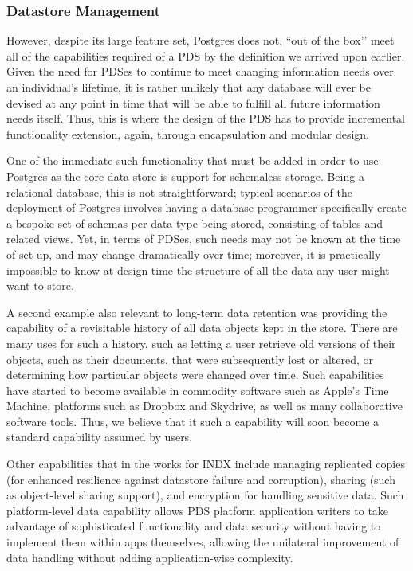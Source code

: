 \documentclass[graybox]{svmult}
\begin{document}
\subsubsection{Datastore Management}
However, despite its large feature set, Postgres does not, ``out of the box’’ meet all of the capabilities required of a PDS by the definition we arrived upon earlier.  Given the need for PDSes to continue to meet changing information needs over an individual’s lifetime, it is rather unlikely that any database will ever be devised at any point in time that will be able to fulfill all future information needs itself.  Thus, this is where the design of the PDS has to provide incremental functionality extension, again, through encapsulation and modular design.

One of the immediate such functionality that must be added in order to use Postgres as the core data store is support for schemaless storage.  Being a relational database, this is not straightforward; typical scenarios of the deployment of Postgres involves having a database programmer specifically create a bespoke set of schemas per data type being stored, consisting of tables and related views. Yet, in terms of PDSes, such needs may not be known at the time of set-up, and may change dramatically over time; moreover, it is practically impossible to know at design time the structure of all the data any user might want to store.

A second example also relevant to long-term data retention was providing the capability of a revisitable history of all data objects kept in the store.  There are many uses for such a history, such as letting a user retrieve old versions of their objects, such as their documents, that were subsequently lost or altered, or determining how particular objects were changed over time.  Such capabilities have started to become available in commodity software such as Apple’s Time Machine, platforms such as Dropbox and Skydrive, as well as many collaborative software tools.  Thus, we believe that it such a capability will soon become a standard capability assumed by users.

Other capabilities that in the works for INDX include managing replicated copies (for enhanced resilience against datastore failure and corruption), sharing (such as object-level sharing support), and encryption for handling sensitive data.  Such platform-level data capability allows PDS platform application writers to take advantage of sophisticated functionality and data security without having to implement them within apps themselves, allowing the unilateral improvement of data handling without adding application-wise complexity.
\end{document}
